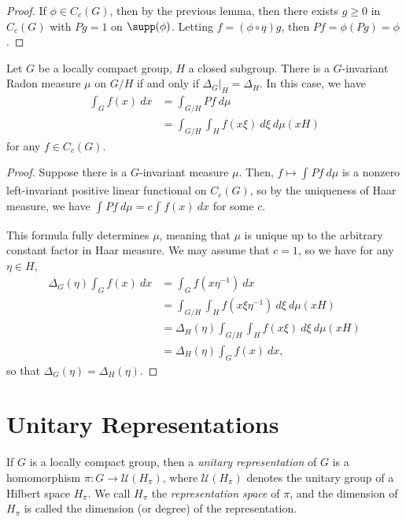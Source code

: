 \documentclass[12pt]{mypackage}
\begin{document}
\begin{proof}
  If $\phi \in C_c(G)$, then by the previous lemma, then there exists $g\geq 0$ in $C_c(G)$ with $Pg = 1$ on $\supp(\phi)$. Letting $f = \left( \phi\circ q \right)g$, then $Pf = \phi\left( Pg \right) = \phi$.
\end{proof}
\begin{theorem}
  Let $G$ be a locally compact group, $H$ a closed subgroup. There is a $G$-invariant Radon measure $\mu$ on $G/H$ if and only if $\Delta_G|_{H} = \Delta_H$. In this case, we have
  \begin{align*}
    \int_{G}^{} f(x)\:dx &= \int_{G/H}^{} Pf\:d\mu\\
                         &= \int_{G/H}^{} \int_{H}^{} f\left( x\xi \right)\:d\xi\:d\mu(xH)
  \end{align*}
  for any $f\in C_c(G)$.
\end{theorem}
\begin{proof}
  Suppose there is a $G$-invariant measure $\mu$. Then, $f\mapsto \int_{}^{} Pf\:d\mu$ is a nonzero left-invariant positive linear functional on $C_c(G)$, so by the uniqueness of Haar measure, we have $ \int_{}^{} Pf\:d\mu = c\int_{}^{} f(x)\:dx $ for some $c$.

  This formula fully determines $\mu$, meaning that $\mu$ is unique up to the arbitrary constant factor in Haar measure. We may assume that $c = 1$, so we have for any $\eta\in H$,
  \begin{align*}
    \Delta_G(\eta) \int_{G}^{} f(x)\:dx &= \int_{G}^{} f\left( x\eta^{-1} \right)\:dx\\
                                        &= \int_{G/H}^{} \int_{H}^{} f\left( x\xi\eta^{-1} \right)\:d\xi\:d\mu(xH)\\
                                        &= \Delta_H(\eta) \int_{G/H}^{} \int_{H}^{} f\left( x\xi \right)\:d\xi\:d\mu(xH)\\
                                        &= \Delta_H(\eta) \int_{G}^{} f(x)\:dx,
  \end{align*}
  so that $\Delta_G(\eta) = \Delta_H(\eta)$.
\end{proof}
\section{Unitary Representations}%
If $G$ is a locally compact group, then a \textit{unitary representation} of $G$ is a homomorphism $\pi\colon G\rightarrow \mathcal{U}\left( H_{\pi} \right)$, where $\mathcal{U}\left( H_{\pi} \right)$ denotes the unitary group of a Hilbert space $H_{\pi}$. We call $H_{\pi}$ the \textit{representation space} of $\pi$, and the dimension of $H_{\pi}$ is called the dimension (or degree) of the representation.
\end{document}
